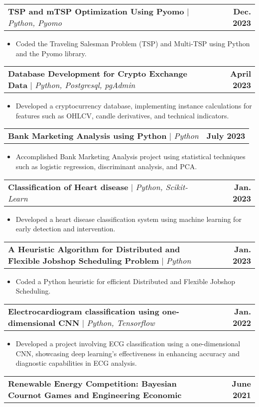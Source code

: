 \documentclass[letterpaper,11pt]{article}
\makeatletter
\newcommand{\resumeItem}[1]{
  \item\small{
    {#1 \vspace{-2pt}}
  }
}
\newcommand{\resumeProjectHeading}[2]{
    \item
    \begin{tabular*}{1.001\textwidth}{l@{\extracolsep{\fill}}r}
      \small#1 & \textbf{\small #2}\\
    \end{tabular*}\vspace{-7pt}
}
\newcommand{\resumeItemListStart}{\begin{itemize}}
\newcommand{\resumeItemListEnd}{\end{itemize}\vspace{-5pt}}
\makeatother
\begin{document}
           \resumeProjectHeading
          {\textbf{TSP and mTSP Optimization Using Pyomo} $|$ \emph{Python, Pyomo}}{Dec. 2023}
          \resumeItemListStart
            \resumeItem{Coded the Traveling Salesman Problem (TSP) and Multi-TSP using Python and the Pyomo library.}
          \resumeItemListEnd 
          \vspace{-13pt}
        \resumeProjectHeading
          {\textbf{Database Development for Crypto Exchange Data} $|$ \emph{Python, Postgresql, pgAdmin}}{April 2023}
          \resumeItemListStart
            \resumeItem{Developed a cryptocurrency database, implementing instance calculations for features such as OHLCV, candle derivatives, and technical indicators.}
          \resumeItemListEnd 
          \vspace{-13pt}
      \resumeProjectHeading
          {\textbf{Bank Marketing Analysis using Python} $|$ \emph{Python}}{July 2023}
          \resumeItemListStart
            \resumeItem{Accomplished Bank Marketing Analysis project using statistical techniques such as logistic regression, discriminant analysis, and PCA.}
          \resumeItemListEnd 
          \vspace{-13pt}
      \resumeProjectHeading
          {\textbf{Classification of Heart disease} $|$ \emph{Python, Scikit-Learn}}{Jan. 2023}
          \resumeItemListStart
            \resumeItem{Developed a heart disease classification system using machine learning for early detection and intervention.}
          \resumeItemListEnd 
          \vspace{-13pt}
        \resumeProjectHeading
          {\textbf{A Heuristic Algorithm for Distributed and Flexible Jobshop Scheduling Problem} $|$ \emph{Python}}{Jan. 2023}
          \resumeItemListStart
            \resumeItem{Coded a Python heuristic for efficient Distributed and Flexible Jobshop Scheduling.}
          \resumeItemListEnd 
          \vspace{-13pt}
        \resumeProjectHeading
          {\textbf{Electrocardiogram classification using one-dimensional CNN} $|$ \emph{Python, Tensorflow}}{Jan. 2022}
          \resumeItemListStart
            \resumeItem{Developed a project involving ECG classification using a one-dimensional CNN, showcasing deep learning's effectiveness in enhancing accuracy and diagnostic capabilities in ECG analysis.}
          \resumeItemListEnd 
          \vspace{-13pt}
      \resumeProjectHeading
          {\textbf{Renewable Energy Competition: Bayesian Cournot Games and Engineering Economic}  \emph{}}{June 2021}
\end{document}
